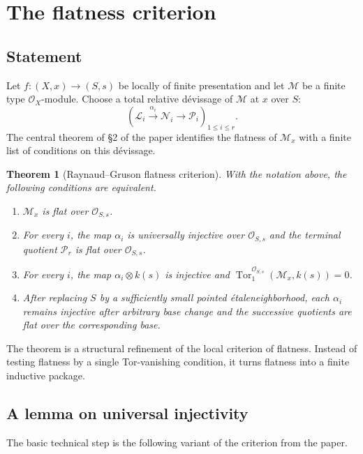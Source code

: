 \documentclass[11pt,oneside]{article}
\newtheorem{theorem}{Theorem}[section]
\newcommand{\Lcal}{\mathcal L}
\newcommand{\M}{\mathcal M}
\newcommand{\N}{\mathcal N}
\newcommand{\Pcal}{\mathcal P}
\newcommand{\OO}{\mathcal O}
\newcommand{\Tor}{\operatorname{Tor}}
\newcommand{\etale}{\'etale}
\begin{document}
\section{The flatness criterion}

\subsection{Statement}

Let $f\colon (X,x)\to(S,s)$ be locally of finite presentation and let $\M$ be a finite type $\OO_X$-module.  Choose a total relative d\'evissage of $\M$ at $x$ over $S$:
\[
(\Lcal_i\xrightarrow{\alpha_i}\N_i\to \Pcal_i)_{1\le i\le r}.
\]
The central theorem of \S2 of the paper identifies the flatness of $\M_x$ with a finite list of conditions on this d\'evissage.

\begin{theorem}[Raynaud--Gruson flatness criterion]\label{thm:flat-criterion}
With the notation above, the following conditions are equivalent.
\begin{enumerate}[label=\textup{(\roman*)}]
  \item $\M_x$ is flat over $\OO_{S,s}$.
  \item For every $i$, the map $\alpha_i$ is universally injective over $\OO_{S,s}$ and the terminal quotient $\Pcal_r$ is flat over $\OO_{S,s}$.
  \item For every $i$, the map $\alpha_i\otimes k(s)$ is injective and $\Tor_1^{\OO_{S,s}}(\M_x,k(s))=0$.
  \item After replacing $S$ by a sufficiently small pointed \etale neighborhood, each $\alpha_i$ remains injective after arbitrary base change and the successive quotients are flat over the corresponding base.
\end{enumerate}
\end{theorem}

The theorem is a structural refinement of the local criterion of flatness.  Instead of testing flatness by a single Tor-vanishing condition, it turns flatness into a finite inductive package.

\subsection{A lemma on universal injectivity}

The basic technical step is the following variant of the criterion from the paper.
\end{document}
